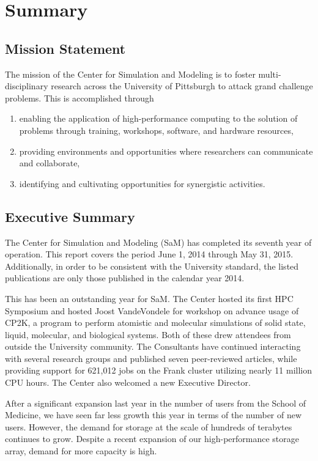 \chapter{Summary}
\section{Mission Statement}

The mission of the Center for Simulation and Modeling is to foster multi-disciplinary research across the University of Pittsburgh to attack grand
challenge problems.  This is accomplished through

\begin{enumerate}
    \item enabling the application of high-performance computing to the
	  solution of problems through training, workshops, software, and
          hardware resources,
    \item providing environments and opportunities where researchers can
          communicate and collaborate,
    \item identifying and cultivating opportunities for synergistic activities.
\end{enumerate}


\section{Executive Summary}

The Center for Simulation and Modeling (SaM) has completed its seventh year of
operation.  This report covers the period June 1, 2014 through May 31, 2015.
Additionally, in order to be consistent with the University standard, the
listed publications are only those published in the calendar year 2014.

This has been an outstanding year for SaM.  The Center hosted its first HPC
Symposium and hosted Joost VandeVondele for workshop on advance usage of CP2K, a program to perform atomistic and molecular simulations of solid state, liquid, molecular, and biological systems. Both of these drew attendees from outside the University community.  The Consultants have
continued interacting with several research groups and published seven
peer-reviewed articles, while providing support for 621,012 jobs on the Frank
cluster utilizing nearly 11 million CPU hours.  The Center also welcomed a new
Executive Director.

After a significant expansion last year in the number of users from the School
of Medicine, we have seen far less growth this year in terms of the number of
new users.  However, the demand for storage at the scale of hundreds of
terabytes continues to grow.  Despite a recent expansion of our high-performance storage array,
demand for more capacity is high.

